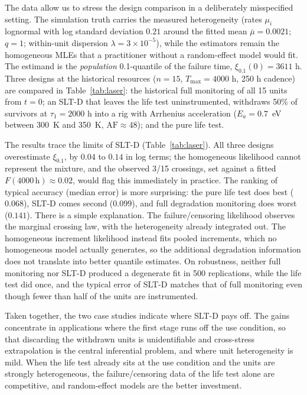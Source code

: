 \documentclass[11pt]{article}
\newcommand{\tmax}{T_{\max}}
\newcommand{\SLTD}{SLT-D}
\begin{document}
The data allow us to stress the design comparison in a deliberately misspecified setting.
The simulation truth carries the measured heterogeneity (rates $\mu_i$ lognormal with log
standard deviation $0.21$ around the fitted mean $\bar\mu = 0.0021$; $q = 1$; within-unit
dispersion $\lambda = 3\times10^{-5}$), while the estimators remain the homogeneous MLEs that
a practitioner without a random-effect model would fit. The estimand is the
\emph{population} 0.1-quantile of the failure time, $\xi_{0.1}(0) = 3611$ h. Three designs at
the historical resources ($n=15$, $\tmax=4000$ h, 250 h cadence) are compared in
Table~\ref{tab:laser}: the historical full monitoring of all 15 units from $t=0$; an \SLTD{}
that leaves the life test uninstrumented, withdraws 50\% of survivors at $\tau_1=2000$ h into
a rig with Arrhenius acceleration ($E_a = 0.7$~eV between 300~K and 350~K,
$\mathrm{AF}\approx48$); and the pure life test.

The results trace the limits of \SLTD{} (Table~\ref{tab:laser}). All three designs
overestimate $\xi_{0.1}$, by $0.04$ to $0.14$ in log terms; the homogeneous likelihood cannot
represent the mixture, and the observed 3/15 crossings, set against a fitted
$F(4000\,\mathrm{h})\approx0.02$, would flag this immediately in practice. The ranking of
typical accuracy (median error) is more surprising: the pure life test does best ($0.068$),
\SLTD{} comes second ($0.099$), and full degradation monitoring does worst ($0.141$). There
is a simple explanation. The failure/censoring likelihood observes the marginal crossing law,
with the heterogeneity already integrated out. The homogeneous increment likelihood instead
fits pooled increments, which no homogeneous model actually generates, so the additional
degradation information does not translate into better quantile estimates. On robustness,
neither full monitoring nor \SLTD{} produced a degenerate fit in 500 replications, while the
life test did once, and the typical error of \SLTD{} matches that of full monitoring even
though fewer than half of the units are instrumented.

Taken together, the two case studies indicate where \SLTD{} pays off. The gains concentrate
in applications where the first stage runs off the use condition, so that discarding the
withdrawn units is unidentifiable and cross-stress extrapolation is the central inferential
problem, and where unit heterogeneity is mild. When the life test already sits at the use
condition and the units are strongly heterogeneous, the failure/censoring data of the life
test alone are competitive, and random-effect models \citep[cf.][]{PengTseng2015} are the
better investment.
\end{document}
